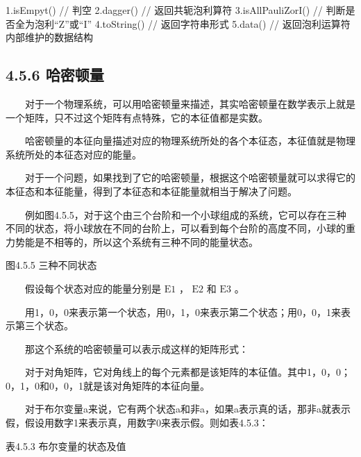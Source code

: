 \documentclass[a4paper,11pt,english]{sphinxmanual}
\begin{document}
\begin{sphinxVerbatim}[commandchars=\\\{\}]
1.isEmpyt()          // 判空
2.dagger()           // 返回共轭泡利算符
3.isAllPauliZorI()   // 判断是否全为泡利“Z”或“I”
4.toString()         // 返回字符串形式
5.data()             // 返回泡利运算符内部维护的数据结构
\end{sphinxVerbatim}


\subsection{4.5.6 哈密顿量}
\label{\detokenize{rst/4.5QAOA_u7b97_u6cd5:id6}}
\sphinxAtStartPar
  对于一个物理系统，可以用哈密顿量来描述，其实哈密顿量在数学表示上就是一个矩阵，只不过这个矩阵有点特殊，它的本征值都是实数。

\sphinxAtStartPar
  哈密顿量的本征向量描述对应的物理系统所处的各个本征态，本征值就是物理系统所处的本征态对应的能量。

\sphinxAtStartPar
  对于一个问题，如果找到了它的哈密顿量，根据这个哈密顿量就可以求得它的本征态和本征能量，得到了本征态和本征能量就相当于解决了问题。

\sphinxAtStartPar
  例如图4.5.5，对于这个由三个台阶和一个小球组成的系统，它可以存在三种不同的状态，将小球放在不同的台阶上，可以看到每个台阶的高度不同，小球的重力势能是不相等的，所以这个系统有三种不同的能量状态。


\begin{center}图4.5.5 三种不同状态
\end{center}
\sphinxAtStartPar
  假设每个状态对应的能量分别是 \(\mathrm{E1}\) ， \(\mathrm{E2}\) 和  \(\mathrm{E3}\) 。

\sphinxAtStartPar
  用1，0，0来表示第一个状态，用0，1，0来表示第二个状态；用0，0，1来表示第三个状态。

\sphinxAtStartPar
  那这个系统的哈密顿量可以表示成这样的矩阵形式：

\sphinxAtStartPar
  对于对角矩阵，它对角线上的每个元素都是该矩阵的本征值。其中1，0，0；0，1，0和0，0，1就是该对角矩阵的本征向量。

\sphinxAtStartPar
  对于布尔变量a来说，它有两个状态a和非a，如果a表示真的话，那非a就表示假，假设用数字1来表示真，用数字0来表示假。则如表4.5.3：

\begin{center}表4.5.3 布尔变量的状态及值
\end{center}
\end{document}
